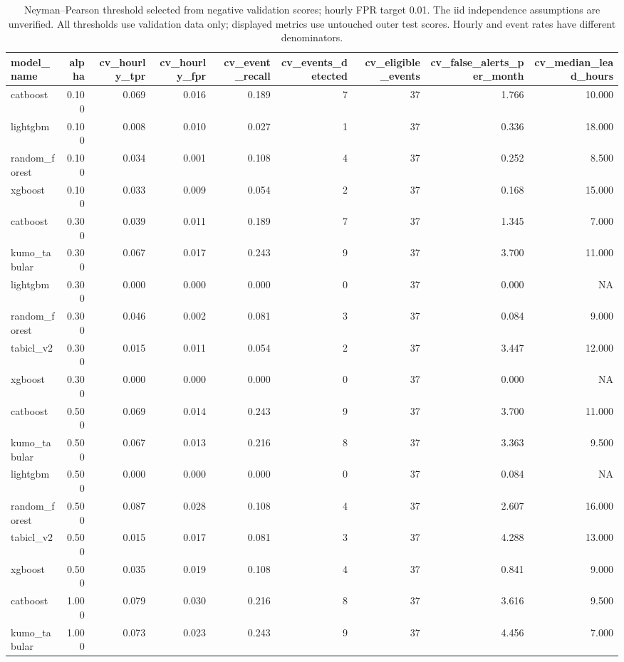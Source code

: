 \begin{table}
\caption{Neyman--Pearson threshold selected from negative validation scores; hourly FPR target 0.01. The iid independence assumptions are unverified. All thresholds use validation data only; displayed metrics use untouched outer test scores. Hourly and event rates have different denominators.}
\begin{tabular}{lrrrrrrrr}
\toprule
model\_name & alpha & cv\_hourly\_tpr & cv\_hourly\_fpr & cv\_event\_recall & cv\_events\_detected & cv\_eligible\_events & cv\_false\_alerts\_per\_month & cv\_median\_lead\_hours \\
\midrule
catboost & 0.100 & 0.069 & 0.016 & 0.189 & 7 & 37 & 1.766 & 10.000 \\
lightgbm & 0.100 & 0.008 & 0.010 & 0.027 & 1 & 37 & 0.336 & 18.000 \\
random\_forest & 0.100 & 0.034 & 0.001 & 0.108 & 4 & 37 & 0.252 & 8.500 \\
xgboost & 0.100 & 0.033 & 0.009 & 0.054 & 2 & 37 & 0.168 & 15.000 \\
catboost & 0.300 & 0.039 & 0.011 & 0.189 & 7 & 37 & 1.345 & 7.000 \\
kumo\_tabular & 0.300 & 0.067 & 0.017 & 0.243 & 9 & 37 & 3.700 & 11.000 \\
lightgbm & 0.300 & 0.000 & 0.000 & 0.000 & 0 & 37 & 0.000 & NA \\
random\_forest & 0.300 & 0.046 & 0.002 & 0.081 & 3 & 37 & 0.084 & 9.000 \\
tabicl\_v2 & 0.300 & 0.015 & 0.011 & 0.054 & 2 & 37 & 3.447 & 12.000 \\
xgboost & 0.300 & 0.000 & 0.000 & 0.000 & 0 & 37 & 0.000 & NA \\
catboost & 0.500 & 0.069 & 0.014 & 0.243 & 9 & 37 & 3.700 & 11.000 \\
kumo\_tabular & 0.500 & 0.067 & 0.013 & 0.216 & 8 & 37 & 3.363 & 9.500 \\
lightgbm & 0.500 & 0.000 & 0.000 & 0.000 & 0 & 37 & 0.084 & NA \\
random\_forest & 0.500 & 0.087 & 0.028 & 0.108 & 4 & 37 & 2.607 & 16.000 \\
tabicl\_v2 & 0.500 & 0.015 & 0.017 & 0.081 & 3 & 37 & 4.288 & 13.000 \\
xgboost & 0.500 & 0.035 & 0.019 & 0.108 & 4 & 37 & 0.841 & 9.000 \\
catboost & 1.000 & 0.079 & 0.030 & 0.216 & 8 & 37 & 3.616 & 9.500 \\
kumo\_tabular & 1.000 & 0.073 & 0.023 & 0.243 & 9 & 37 & 4.456 & 7.000 \\

\end{tabular}
\end{table}
